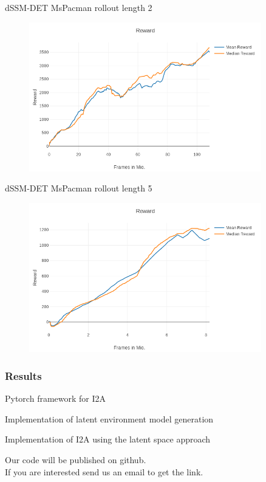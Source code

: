 \begin{frame}{dSSM-DET MsPacman rollout length 2}
	\vspace{-10mm}
    \begin{figure}
        \centering
        \includegraphics[width=0.9\textwidth]{./latent_i2a_images/dSSM_DET_MsPacman_100mio.png}
    \end{figure}
\end{frame}

\begin{frame}{dSSM-DET MsPacman rollout length 5}
	\vspace{-10mm}
    \begin{figure}
        \centering
        \includegraphics[width=0.9\textwidth]{./latent_i2a_images/MsPacman_dSSM_DET_5rollout.png}
    \end{figure}
\end{frame}


\begin{frame}
	\frametitle{Results}
	\begin{PraesentationAufzaehlung}
		\item Pytorch framework for I2A
		\item Implementation of latent environment model generation
		\item Implementation of I2A using the latent space approach
	\end{PraesentationAufzaehlung}
	
	\bigskip
	Our code will be published on github.\\
	If you are interested send us an email to get the link.
\end{frame}


